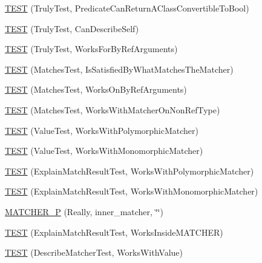 \begin{DoxyCompactItemize}
\item 
\mbox{\hyperlink{namespacetesting_1_1gmock__matchers__test_a24529fd7834d272009af74106422fe54}{T\+E\+ST}} (Truly\+Test, Predicate\+Can\+Return\+A\+Class\+Convertible\+To\+Bool)
\item 
\mbox{\hyperlink{namespacetesting_1_1gmock__matchers__test_af474a9719e614d521c71bdf7c39f6a7a}{T\+E\+ST}} (Truly\+Test, Can\+Describe\+Self)
\item 
\mbox{\hyperlink{namespacetesting_1_1gmock__matchers__test_ae702d436c52bd37fe3e8d405d7e6a691}{T\+E\+ST}} (Truly\+Test, Works\+For\+By\+Ref\+Arguments)
\item 
\mbox{\hyperlink{namespacetesting_1_1gmock__matchers__test_a6617484cbb644af9882fc5d853112aae}{T\+E\+ST}} (Matches\+Test, Is\+Satisfied\+By\+What\+Matches\+The\+Matcher)
\item 
\mbox{\hyperlink{namespacetesting_1_1gmock__matchers__test_a6cfa391c9035262ccdc0d8f59e037b4d}{T\+E\+ST}} (Matches\+Test, Works\+On\+By\+Ref\+Arguments)
\item 
\mbox{\hyperlink{namespacetesting_1_1gmock__matchers__test_a9fd734ae5afb64a7285503bc0870c255}{T\+E\+ST}} (Matches\+Test, Works\+With\+Matcher\+On\+Non\+Ref\+Type)
\item 
\mbox{\hyperlink{namespacetesting_1_1gmock__matchers__test_a150118d4e990ba9fb9978329e742c931}{T\+E\+ST}} (Value\+Test, Works\+With\+Polymorphic\+Matcher)
\item 
\mbox{\hyperlink{namespacetesting_1_1gmock__matchers__test_a53403682e9ffc12152b0b1c7f55dfa12}{T\+E\+ST}} (Value\+Test, Works\+With\+Monomorphic\+Matcher)
\item 
\mbox{\hyperlink{namespacetesting_1_1gmock__matchers__test_a985e2bc1546b67de764d759de111e8e9}{T\+E\+ST}} (Explain\+Match\+Result\+Test, Works\+With\+Polymorphic\+Matcher)
\item 
\mbox{\hyperlink{namespacetesting_1_1gmock__matchers__test_aeff2711a03b27a66c1c98ed97ff49b09}{T\+E\+ST}} (Explain\+Match\+Result\+Test, Works\+With\+Monomorphic\+Matcher)
\item 
\mbox{\hyperlink{namespacetesting_1_1gmock__matchers__test_ab4f04d3b75ca92e4f5fd711b9f2a514a}{M\+A\+T\+C\+H\+E\+R\+\_\+P}} (Really, inner\+\_\+matcher, \char`\"{}\char`\"{})
\item 
\mbox{\hyperlink{namespacetesting_1_1gmock__matchers__test_ae57edef8890da6b929dd0d21c2f7c071}{T\+E\+ST}} (Explain\+Match\+Result\+Test, Works\+Inside\+M\+A\+T\+C\+H\+ER)
\item 
\mbox{\hyperlink{namespacetesting_1_1gmock__matchers__test_a2777633a1fadcdb5b6ad1a8ee78a8b54}{T\+E\+ST}} (Describe\+Matcher\+Test, Works\+With\+Value)

\end{DoxyCompactItemize}
